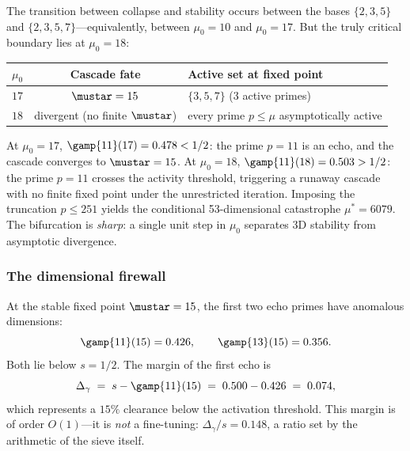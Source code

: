 \documentclass[12pt,a4paper]{article}
\begin{document}
The transition between collapse and stability occurs between the
bases $\{2,3,5\}$ and $\{2,3,5,7\}$---equivalently, between
$\mu_0 = 10$ and $\mu_0 = 17$.  But the truly critical
boundary lies at $\mu_0 = 18$:

\begin{center}
\begin{tabular}{lcl}
\toprule
$\mu_0$ & Cascade fate & Active set at fixed point \\
\midrule
$17$ & $\mustar = 15$ & $\{3,5,7\}$ \quad (3 active primes) \\
$18$ & divergent (no finite $\mustar$) & every prime $p \leq \mu$
  asymptotically active \\
\bottomrule
\end{tabular}
\end{center}

At $\mu_0 = 17$, $\gamp{11}(17) = 0.478 < 1/2$: the prime
$p = 11$ is an echo, and the cascade converges to $\mustar = 15$.
At $\mu_0 = 18$, $\gamp{11}(18) = 0.503 > 1/2$: the prime $p = 11$
crosses the activity threshold, triggering a runaway cascade with
no finite fixed point under the unrestricted iteration.  Imposing
the truncation $p \leq 251$ yields the conditional 53-dimensional
catastrophe $\mu^* = 6079$.  The bifurcation is \emph{sharp}: a
single unit step in $\mu_0$ separates 3D stability from
asymptotic divergence.

\subsubsection{The dimensional firewall}
\label{sec:ch8_firewall}

At the stable fixed point $\mustar = 15$, the first two echo
primes have anomalous dimensions:
\begin{equation}
  \gamp{11}(15) = 0.426, \qquad \gamp{13}(15) = 0.356.
  \label{eq:ghost_gamma_values}
\end{equation}
Both lie below $s = 1/2$.  The margin of the first echo is
\begin{equation}
  \Delta_\gamma \;=\; s - \gamp{11}(15) \;=\; 0.500 - 0.426 \;=\; 0.074,
  \label{eq:firewall_margin}
\end{equation}
which represents a $15\%$ clearance below the activation threshold.
This margin is of order $O(1)$---it is \emph{not} a fine-tuning:
$\Delta_\gamma / s = 0.148$, a ratio set by the arithmetic of the
sieve itself.
\end{document}
